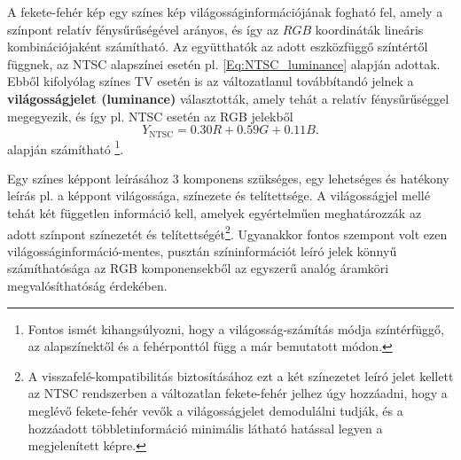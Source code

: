 A fekete-fehér kép egy színes kép világosságinformációjának fogható fel, amely a színpont relatív fénysűrűségével arányos, és így az $RGB$ koordináták lineáris kombinációjaként számítható.
Az együtthatók az adott eszközfüggő színtértől függnek, az NTSC alapszínei esetén pl. \eqref{Eq:NTSC_luminance} alapján adottak.
Ebből kifolyólag színes TV esetén is az változatlanul továbbítandó jelnek a \textbf{világosságjelet (luminance)} választották, amely tehát a relatív fénysűrűséggel megegyezik, és így pl. NTSC esetén az RGB jelekből
\begin{equation}Y_{\mathrm{NTSC}} = 
   0.30R + 0.59G + 0.11 B. 
   \label{Eq:NTSC_luminance}
\end{equation}
alapján számítható \footnote{Fontos ismét kihangsúlyozni, hogy a világosság-számítás módja színtérfüggő, az alapszínektől és a fehérponttól függ a már bemutatott módon.}.

Egy színes képpont leírásához 3 komponens szükséges, egy lehetséges és hatékony leírás pl. a képpont világossága, színezete és telítettsége.
A világosságjel mellé tehát két független információ kell, amelyek egyértelműen meghatározzák az adott színpont színezetét és telítettségét\footnote{A visszafelé-kompatibilitás biztosításához ezt a két színezetet leíró jelet kellett az NTSC rendszerben a változatlan fekete-fehér jelhez úgy hozzáadni, hogy a meglévő fekete-fehér vevők a világosságjelet demodulálni tudják, és a hozzáadott többletinformáció minimális látható hatással legyen a megjelenített képre.}.
Ugyanakkor fontos szempont volt ezen világosságinformáció-mentes, pusztán színinformációt leíró jelek könnyű számíthatósága az RGB komponensekből az egyszerű analóg áramköri megvalósíthatóság érdekében.

